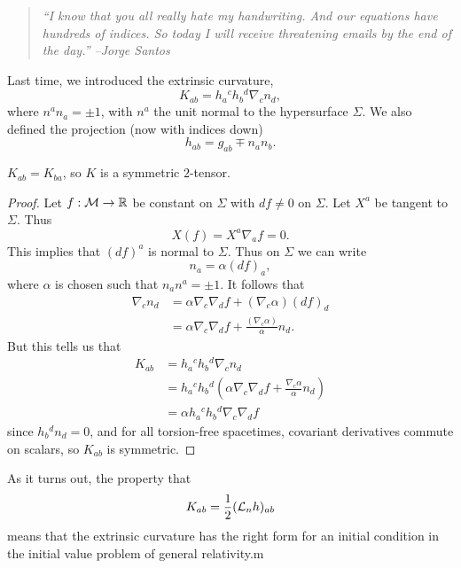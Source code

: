 \begin{quote}
    \textit{``I know that you all really hate my handwriting. And our equations have hundreds of indices. So today I will receive threatening emails by the end of the day.'' --Jorge Santos}
\end{quote}

Last time, we introduced the extrinsic curvature,
\begin{equation}
    K_{ab} = h_a{}^c h_b{}^d \nabla_c n_d,
\end{equation}
where $n^a n_a= \pm1$, with $n^a$ the unit normal to the hypersurface $\Sigma$. We also defined the projection (now with indices down)
\begin{equation}
    h_{ab}=g_{ab} \mp n_a n_b.
\end{equation}
\begin{lem}
    $K_{ab}=K_{ba}$, so $K$ is a symmetric $2$-tensor.
\end{lem}
\begin{proof}
    Let $f:\mathcal{M} \to \mathbb{R}$ be constant on $\Sigma$ with $df\neq 0$ on $\Sigma$. Let $X^a$ be tangent to $\Sigma$. Thus
    \begin{equation}
        X(f)=X^a \nabla_a f=0.
    \end{equation}
    This implies that $(df)^a$ is normal to $\Sigma$.
    Thus on $\Sigma$ we can write
    \begin{equation}
        n_a = \alpha(df)_{a},
    \end{equation}
    where $\alpha$ is chosen such that $n_a n^a = \pm 1$. It follows that
    \begin{align}
        \nabla_c n_d &= \alpha \nabla_c \nabla_d f + (\nabla_c \alpha) (df)_d\\
        &= \alpha \nabla_c \nabla_d f +\frac{(\nabla_c \alpha)}{\alpha} n_d.
    \end{align}
    But this tells us that
    \begin{align}
        K_{ab}&=h_a{}^c h_b{}^d \nabla_c n_d \\
            &=h_a{}^c h_b{}^d (\alpha \nabla_c \nabla_d f + \frac{\nabla_c \alpha}{\alpha} n_d)\\
            &= \alpha h_a{}^c h_b{}^d \nabla_c \nabla_d f
    \end{align}
    since $h_b{}^d n_d =0$, and for all torsion-free spacetimes, covariant derivatives commute on scalars, so $K_{ab}$ is symmetric.
\end{proof}

As it turns out, the property that
\begin{equation}
    K_{ab}=\frac{1}{2}(\mathcal L_n h)_{ab}
\end{equation}
means that the extrinsic curvature has the right form for an initial condition in the initial value problem of general relativity.m


